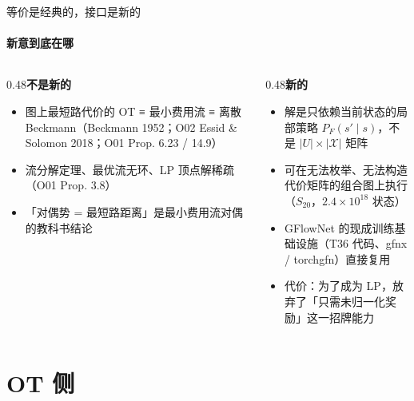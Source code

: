 \documentclass[aspectratio=169,10pt]{beamer}
\newcommand{\pos}[1]{\textcolor{positive}{#1}}
\newcommand{\con}[1]{\textcolor{negative}{#1}}
\begin{document}
\begin{frame}{等价是经典的，接口是新的}\framesubtitle{新意到底在哪}
\begin{columns}[T]
\begin{column}{0.48\textwidth}\textbf{\pos{不是新的}}\vspace{2pt}
{\footnotesize\begin{itemize}
\item 图上最短路代价的 OT ≡ 最小费用流 ≡ 离散 Beckmann（Beckmann 1952；O02 Essid \& Solomon 2018；O01 Prop. 6.23 / 14.9）
\item 流分解定理、最优流无环、LP 顶点解稀疏（O01 Prop. 3.8）
\item 「对偶势 = 最短路距离」是最小费用流对偶的教科书结论
\end{itemize}}\end{column}
\hfill
\begin{column}{0.48\textwidth}\textbf{\pos{新的}}\vspace{2pt}
{\footnotesize\begin{itemize}
\item 解是只依赖当前状态的局部策略 $P_F(s'\mid s)$，不是 $|U|\times|\mathcal X|$ 矩阵
\item 可在无法枚举、无法构造代价矩阵的组合图上执行（$S_{20}$，$2.4\times10^{18}$ 状态）
\item GFlowNet 的现成训练基础设施（T36 代码、gfnx / torchgfn）直接复用
\item \con{代价}：为了成为 LP，放弃了「只需未归一化奖励」这一招牌能力
\end{itemize}}\end{column}
\end{columns}
\end{frame}

\section{OT 侧}
\end{document}
